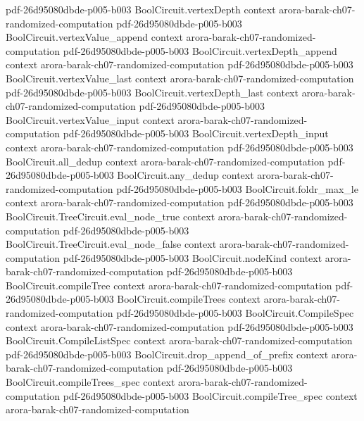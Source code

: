 \begin{theorem}
  {pdf-26d95080dbde-p005-b003}
\proofstep
  {BoolCircuit.vertexDepth}
  {context}
  {arora-barak-ch07-randomized-computation}
  {pdf-26d95080dbde-p005-b003}
\proofstep
  {BoolCircuit.vertexValue_append}
  {context}
  {arora-barak-ch07-randomized-computation}
  {pdf-26d95080dbde-p005-b003}
\proofstep
  {BoolCircuit.vertexDepth_append}
  {context}
  {arora-barak-ch07-randomized-computation}
  {pdf-26d95080dbde-p005-b003}
\proofstep
  {BoolCircuit.vertexValue_last}
  {context}
  {arora-barak-ch07-randomized-computation}
  {pdf-26d95080dbde-p005-b003}
\proofstep
  {BoolCircuit.vertexDepth_last}
  {context}
  {arora-barak-ch07-randomized-computation}
  {pdf-26d95080dbde-p005-b003}
\proofstep
  {BoolCircuit.vertexValue_input}
  {context}
  {arora-barak-ch07-randomized-computation}
  {pdf-26d95080dbde-p005-b003}
\proofstep
  {BoolCircuit.vertexDepth_input}
  {context}
  {arora-barak-ch07-randomized-computation}
  {pdf-26d95080dbde-p005-b003}
\proofstep
  {BoolCircuit.all_dedup}
  {context}
  {arora-barak-ch07-randomized-computation}
  {pdf-26d95080dbde-p005-b003}
\proofstep
  {BoolCircuit.any_dedup}
  {context}
  {arora-barak-ch07-randomized-computation}
  {pdf-26d95080dbde-p005-b003}
\proofstep
  {BoolCircuit.foldr_max_le}
  {context}
  {arora-barak-ch07-randomized-computation}
  {pdf-26d95080dbde-p005-b003}
\proofstep
  {BoolCircuit.TreeCircuit.eval_node_true}
  {context}
  {arora-barak-ch07-randomized-computation}
  {pdf-26d95080dbde-p005-b003}
\proofstep
  {BoolCircuit.TreeCircuit.eval_node_false}
  {context}
  {arora-barak-ch07-randomized-computation}
  {pdf-26d95080dbde-p005-b003}
\proofstep
  {BoolCircuit.nodeKind}
  {context}
  {arora-barak-ch07-randomized-computation}
  {pdf-26d95080dbde-p005-b003}
\proofstep
  {BoolCircuit.compileTree}
  {context}
  {arora-barak-ch07-randomized-computation}
  {pdf-26d95080dbde-p005-b003}
\proofstep
  {BoolCircuit.compileTrees}
  {context}
  {arora-barak-ch07-randomized-computation}
  {pdf-26d95080dbde-p005-b003}
\proofstep
  {BoolCircuit.CompileSpec}
  {context}
  {arora-barak-ch07-randomized-computation}
  {pdf-26d95080dbde-p005-b003}
\proofstep
  {BoolCircuit.CompileListSpec}
  {context}
  {arora-barak-ch07-randomized-computation}
  {pdf-26d95080dbde-p005-b003}
\proofstep
  {BoolCircuit.drop_append_of_prefix}
  {context}
  {arora-barak-ch07-randomized-computation}
  {pdf-26d95080dbde-p005-b003}
\proofstep
  {BoolCircuit.compileTrees_spec}
  {context}
  {arora-barak-ch07-randomized-computation}
  {pdf-26d95080dbde-p005-b003}
\proofstep
  {BoolCircuit.compileTree_spec}
  {context}
  {arora-barak-ch07-randomized-computation}

\end{theorem}
